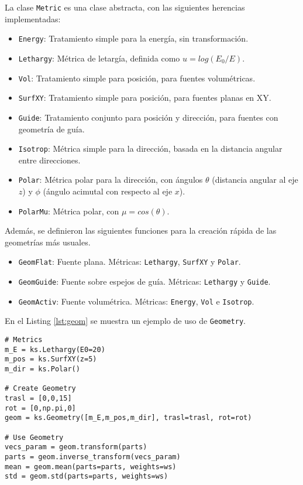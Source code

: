 La clase \verb|Metric| es una clase abstracta, con las siguientes herencias implementadas:
\begin{itemize}
	\item \verb|Energy|: Tratamiento simple para la energía, sin transformación.
	\item \verb|Lethargy|: Métrica de letargía, definida como $u = log(E_0/E)$.
	\item \verb|Vol|: Tratamiento simple para posición, para fuentes volumétricas.
	\item \verb|SurfXY|: Tratamiento simple para posición, para fuentes planas en XY.
	\item \verb|Guide|: Tratamiento conjunto para posición y dirección, para fuentes con geometría de guía.
	\item \verb|Isotrop|: Métrica simple para la dirección, basada en la distancia angular entre direcciones. 
	\item \verb|Polar|: Métrica polar para la dirección, con ángulos $\theta$ (distancia angular al eje $z$) y $\phi$ (ángulo acimutal con respecto al eje $x$).
	\item \verb|PolarMu|: Métrica polar, con $\mu=cos(\theta)$.
\end{itemize}
Además, se definieron las siguientes funciones para la creación rápida de las geometrías más usuales.
\begin{itemize}
	\item \verb|GeomFlat|: Fuente plana. Métricas: \verb|Lethargy|, \verb|SurfXY| y \verb|Polar|.
	\item \verb|GeomGuide|: Fuente sobre espejos de guía. Métricas: \verb|Lethargy| y \verb|Guide|.
	\item \verb|GeomActiv|: Fuente volumétrica. Métricas: \verb|Energy|, \verb|Vol| e \verb|Isotrop|.
\end{itemize}

En el Listing \ref{lst:geom} se muestra un ejemplo de uso de \verb|Geometry|.

\begin{lstlisting}[language=Python2, label={lst:geom}, caption=Ejemplo de uso de \texttt{Geometry}.]
# Metrics
m_E = ks.Lethargy(E0=20)
m_pos = ks.SurfXY(z=5)
m_dir = ks.Polar()

# Create Geometry
trasl = [0,0,15]
rot = [0,np.pi,0]
geom = ks.Geometry([m_E,m_pos,m_dir], trasl=trasl, rot=rot)

# Use Geometry
vecs_param = geom.transform(parts)
parts = geom.inverse_transform(vecs_param)
mean = geom.mean(parts=parts, weights=ws)
std = geom.std(parts=parts, weights=ws)
\end{lstlisting}


